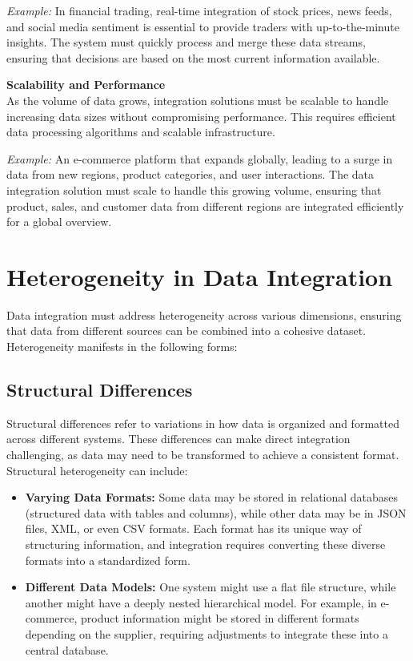 \documentclass[12pt]{article}
\begin{document}
\textit{Example:} In financial trading, real-time integration of stock prices, news feeds, and social media sentiment is essential to provide traders with up-to-the-minute insights. The system must quickly process and merge these data streams, ensuring that decisions are based on the most current information available. 

\textbf{Scalability and Performance} \\
As the volume of data grows, integration solutions must be scalable to handle increasing data sizes without compromising performance. This requires efficient data processing algorithms and scalable infrastructure.

\textit{Example:} An e-commerce platform that expands globally, leading to a surge in data from new regions, product categories, and user interactions. The data integration solution must scale to handle this growing volume, ensuring that product, sales, and customer data from different regions are integrated efficiently for a global overview.

\section{Heterogeneity in Data Integration}
Data integration must address heterogeneity across various dimensions, ensuring that data from different sources can be combined into a cohesive dataset. Heterogeneity manifests in the following forms:

\subsection{Structural Differences}
Structural differences refer to variations in how data is organized and formatted across different systems. These differences can make direct integration challenging, as data may need to be transformed to achieve a consistent format. Structural heterogeneity can include:

\begin{itemize}
    \item \textbf{Varying Data Formats:} Some data may be stored in relational databases (structured data with tables and columns), while other data may be in JSON files, XML, or even CSV formats. Each format has its unique way of structuring information, and integration requires converting these diverse formats into a standardized form.

    \item \textbf{Different Data Models:} One system might use a flat file structure, while another might have a deeply nested hierarchical model. For example, in e-commerce, product information might be stored in different formats depending on the supplier, requiring adjustments to integrate these into a central database.
\end{itemize}
\end{document}
